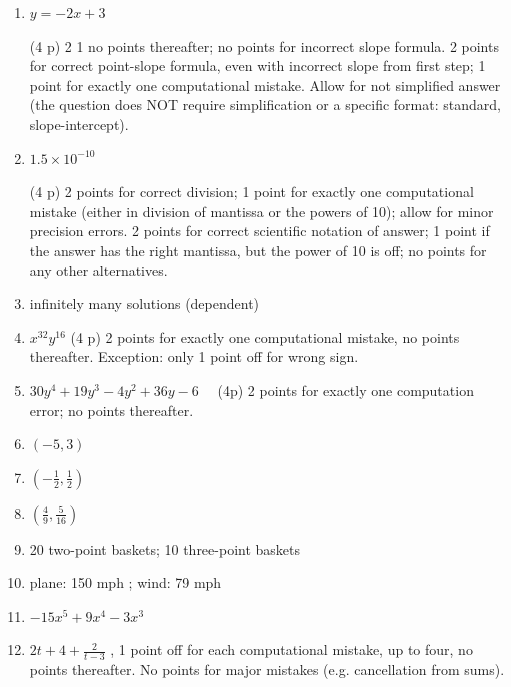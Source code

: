 \documentclass{ximera}
\begin{document}
\begin{enumerate}
\item $y=-2 x+3$ 

 (4 p) 2  1  no points thereafter; no points for incorrect slope formula. 2 points for correct point-slope formula, even with incorrect slope from first step; 1 point for exactly one computational mistake. Allow for not simplified answer (the question does NOT require simplification or a specific format: standard, slope-intercept).

\item $1.5 \times 10^{-10}$   

 (4 p) 2 points for correct division;  1 point for exactly one computational mistake (either in division of mantissa or the powers of 10); allow for minor precision errors. 2 points for correct scientific notation of answer; 1 point if the answer has the right mantissa, but the power of 10 is off; no points for any other alternatives.

\item infinitely many solutions (dependent)

\item $x^{32} y^{16}$ (4 p) 2 points for exactly one computational mistake, no points thereafter. Exception: only  1  point off for wrong sign. 




  \item $30 y^{4}+19 y^{3}-4 y^{2}+36 y-6 \quad$ (4p) 2 points for exactly one computation error; no points thereafter.
  \item $(-5,3)$
  \item $\left(-\frac{1}{2}, \frac{1}{2}\right)$
  \item $\left(\frac{4}{9}, \frac{5}{16}\right)$
  \item 20 two-point baskets; 10 three-point baskets
  \item plane: 150 mph ; wind: 79 mph
  \item $-15 x^{5}+9 x^{4}-3 x^{3}$



\item   $2 t+4+\frac{2}{t-3}$ ,  1  point off for each computational mistake, up to four, no points thereafter. No points for major mistakes (e.g. cancellation from sums).\\

\end{enumerate}
\end{document}
